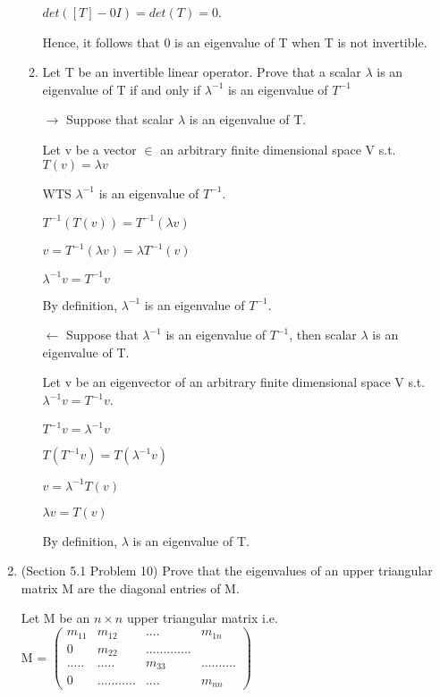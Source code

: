 \documentclass[12pt]{article}
\begin{document}
\begin{enumerate}
\begin{enumerate}[label=(\alph*)]
        $det([T] - 0I) = det(T) = 0$. 

        Hence, it follows that 0 is an eigenvalue of T when T is not invertible. 

        \qedsymbol

        \item Let T be an invertible linear operator. Prove that a scalar $\lambda$ is an eigenvalue of T if and only if $\lambda^{-1}$ is an eigenvalue of $T^{-1}$ 
        
        $\rightarrow $ Suppose that scalar $\lambda$ is an eigenvalue of T.

        Let v be a vector $\in$ an arbitrary finite dimensional space V s.t. $T(v) = \lambda v$

        WTS $\lambda^{-1}$ is an eigenvalue of $T^{-1}$. 

        $T^{-1}(T(v)) = T^{-1}(\lambda v)$

        $v = T^{-1}(\lambda v) = \lambda T^{-1}(v)$

        $\lambda^{-1}v = T^{-1}v$

        By definition, $\lambda^{-1}$ is an eigenvalue of $T^{-1}$. 

        $\leftarrow $ Suppose that $\lambda^{-1}$ is an eigenvalue of $T^{-1}$, then scalar $\lambda$ is an eigenvalue of T. 

        Let v be an eigenvector of an arbitrary finite dimensional space V s.t. $\lambda^{-1}v = T^{-1}v$. 

        $T^{-1}v = \lambda^{-1}v$

        $T(T^{-1}v) = T(\lambda^{-1}v)$

        $v = \lambda^{-1}T(v)$

        $\lambda v = T(v)$

        By definition, $\lambda$ is an eigenvalue of T.  \qedsymbol{}
        
    \end{enumerate}

    \item (Section 5.1 Problem 10) Prove that the eigenvalues of an upper triangular matrix M are the diagonal entries of M. 

    Let M be an $n \times n $ upper triangular matrix i.e. \\
    M = $\begin{pmatrix}
        m_{11} & m_{12} & .... &m_{1n} \\
        0 & m_{22} &............. \\
        .....&.....&m_{33}&..........\\
        0 & ...........& .... &m_{nn}
    \end{pmatrix}$


\end{enumerate}
\end{document}
